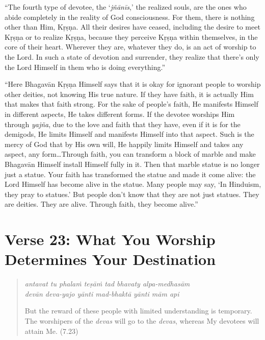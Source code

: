 \documentclass[12pt, twoside, openright]{memoir}
\begin{document}
\enquote{The fourth type of devotee, the \enquote{\textit{jñānīs},} the realized souls, are the ones who abide completely in the reality of God consciousness. For them, there is nothing other than Him, Kṛṣṇa. All their desires have ceased, including the desire to meet Kṛṣṇa or to realize Kṛṣṇa, because they perceive Kṛṣṇa within themselves, in the core of their heart. Wherever they are, whatever they do, is an act of worship to the Lord. In such a state of devotion and surrender, they realize that there’s only the Lord Himself in them who is doing everything.}

\enquote{Here Bhagavān Kṛṣṇa Himself says that it is okay for ignorant people to worship other deities, not knowing His true nature. If they have faith, it is actually Him that makes that faith strong. For the sake of people’s faith, He manifests Himself in different aspects, He takes different forms. If the devotee worships Him through \textit{yajña}, due to the love and faith that they have, even if it is for the demigods, He limits Himself and manifests Himself into that aspect. Such is the mercy of God that by His own will, He happily limits Himself and takes any aspect, any form\ldots Through faith, you can transform a block of marble and make Bhagavān Himself install Himself fully in it. Then that marble statue is no longer just a statue. Your faith has transformed the statue and made it come alive: the Lord Himself has become alive in the statue. Many people may say, \enquote{In Hinduism, they pray to statues.} But people don’t know that they are not just statues. They are deities. They are alive. Through faith, they become alive.}

\section{Verse 23: What You Worship Determines Your Destination}\label{sec-verse-23-what-you-worship-determines-your-destination}


\par
\begin{verse}
\textit{antavat tu phalaṁ teṣāṁ tad bhavaty alpa-medhasām} \\
\textit{devān deva-yajo yānti mad-bhaktā yānti mām api}

\noindent But the reward of these people with limited understanding is temporary. The worshipers of the \textit{devas} will go to the \textit{devas}, whereas My devotees will attain Me. (7.23)
\end{verse}
\par
\end{document}
